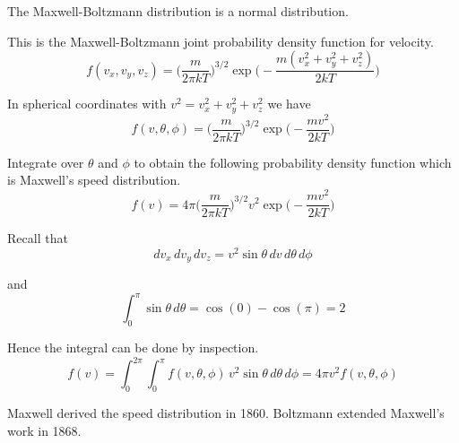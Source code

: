 \documentclass[12pt]{article}
\begin{document}
The Maxwell-Boltzmann distribution is a normal distribution.

\bigskip
This is the Maxwell-Boltzmann joint probability density function for velocity.
\begin{equation*}
f(v_x,v_y,v_z)=
\bigg(\frac{m}{2\pi kT}\bigg)^{3/2}
\exp\bigg({-}\frac{m(v_x^2+v_y^2+v_z^2)}{2kT}\bigg)
\end{equation*}

In spherical coordinates with $v^2=v_x^2+v_y^2+v_z^2$ we have
\begin{equation*}
f(v,\theta,\phi)=
\bigg(\frac{m}{2\pi kT}\bigg)^{3/2}
\exp\bigg({-}\frac{mv^2}{2kT}\bigg)
\end{equation*}

Integrate over $\theta$ and $\phi$
to obtain the following probability density function
which is Maxwell's speed distribution.
\begin{equation*}
f(v)=4\pi\bigg(\frac{m}{2\pi kT}\bigg)^{3/2}
v^2\exp\bigg({-}\frac{mv^2}{2kT}\bigg)
\end{equation*}

Recall that
\begin{equation*}
dv_x\,dv_y\,dv_z=v^2\sin\theta\,dv\,d\theta\,d\phi
\end{equation*}

and
\begin{equation*}
\int_0^\pi\sin\theta\,d\theta=\cos(0)-\cos(\pi)=2
\end{equation*}

Hence the integral can be done by inspection.
\begin{equation*}
f(v)=\int_0^{2\pi}\int_0^\pi f(v,\theta,\phi)\,v^2\sin\theta\,d\theta\,d\phi
=4\pi v^2f(v,\theta,\phi)
\end{equation*}

Maxwell derived the speed distribution in 1860.
Boltzmann extended Maxwell's work in 1868.
\end{document}
